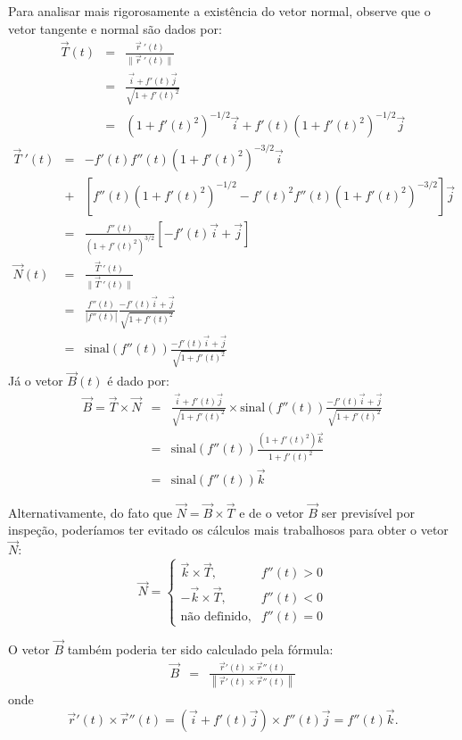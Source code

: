 \begin{resol}
Para analisar mais rigorosamente a existência do vetor normal, observe que o vetor tangente e normal são dados por:
\begin{eqnarray*}
 \vec{T}(t)&=&\frac{\vec{r}~\!'(t)}{\|\vec{r}~\!'(t)\|}\\
 &=&\frac{\vec{i}+f'(t)\vec{j}}{\sqrt{1+f'(t)^2}}\\
 &=&\left(1+f'(t)^2\right)^{-1/2}\vec{i}+f'(t)\left(1+f'(t)^2\right)^{-1/2}\vec{j}
\end{eqnarray*}
\begin{eqnarray*}
 \vec{T}~\!'(t)
 &=&-f'(t)f''(t)\left(1+f'(t)^2\right)^{-3/2}\vec{i}\\
 &+&\left[f''(t)\left(1+f'(t)^2\right)^{-1/2}-f'(t)^2f''(t)\left(1+f'(t)^2\right)^{-3/2}\right]\vec{j}\\
 &=&\frac{f''(t)}{\left(1+f'(t)^2\right)^{3/2}}\left[-f'(t)\vec{i}+\vec{j}\right]\\
\vec{N}(t)&=&\frac{\vec{T}~\!'(t)}{\|\vec{T}~\!'(t)\|}\\
&=&\frac{f''(t)}{|f''(t)|}\frac{-f'(t)\vec{i}+\vec{j}}{\sqrt{1+f'(t)^2}}\\
&=&\text{sinal}\left(f''(t)\right)\frac{-f'(t)\vec{i}+\vec{j}}{\sqrt{1+f'(t)^2}}
\end{eqnarray*}
Já o vetor $\vec{B}(t)$ é dado por:
\begin{eqnarray*}
\vec{B}=\vec{T}\times \vec{N} &=& \frac{\vec{i}+f'(t)\vec{j}}{\sqrt{1+f'(t)^2}} \times \text{sinal}\left(f''(t)\right)\frac{-f'(t)\vec{i}+\vec{j}}{\sqrt{1+f'(t)^2}}\\
&=&\text{sinal}(f''(t))\frac{(1+f'(t)^2)\vec{k}}{1+f'(t)^2}\\
&=&\text{sinal}(f''(t))\vec{k}
\end{eqnarray*}

Alternativamente, do fato que $\vec{N}=\vec{B}\times \vec{T}$ e de o vetor $\vec{B}$ ser previsível por inspeção, poderíamos ter evitado os cálculos mais trabalhosos para obter o vetor $\vec{N}$:
$$\vec{N}=\left\{
\begin{array}{rr}
\vec{k}\times\vec{T},&f''(t)>0\\
-\vec{k}\times\vec{T},&f''(t)<0\\
\text{não definido},&f''(t)=0
\end{array}
\right.$$

O vetor $\vec{B}$ também poderia ter sido calculado pela fórmula:
 \begin{eqnarray*}
  \vec{B}&=&\frac{\vec{r}'(t)\times \vec{r}''(t)}{\left\|\vec{r}'(t)\times \vec{r}''(t)\right\|}
 \end{eqnarray*}
onde $$\vec{r}'(t)\times \vec{r}''(t)=\left(\vec{i}+f'(t)\vec{j}\right)\times f''(t)\vec{j}=f''(t)\vec{k}.$$
\end{resol}

